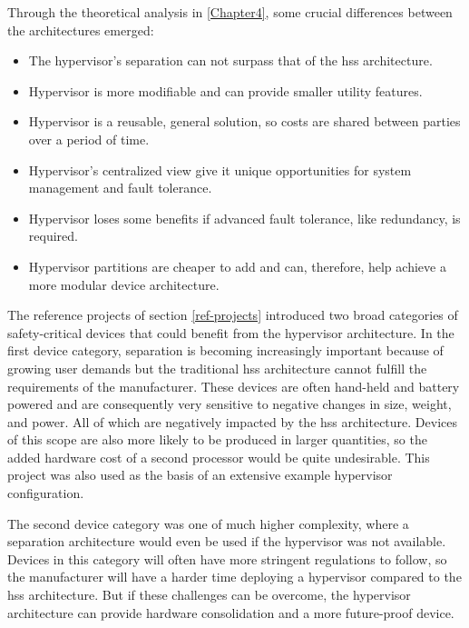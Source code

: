 Through the theoretical analysis in \ref{Chapter4}, some crucial differences between the architectures emerged:
\begin{itemize}
    \item The hypervisor's separation can not surpass that of the \acrshort{hss} architecture.
    \item Hypervisor is more modifiable and can provide smaller utility features.
    \item Hypervisor is a reusable, general solution, so costs are shared between parties over a period of time.
    \item Hypervisor's centralized view give it unique opportunities for system management and fault tolerance.
    \item Hypervisor loses some benefits if advanced fault tolerance, like redundancy, is required.
    \item Hypervisor partitions are cheaper to add and can, therefore, help achieve a more modular device architecture.
\end{itemize}

The reference projects of section \ref{ref-projects} introduced two broad categories of safety-critical devices that could benefit from the hypervisor architecture. In the first device category, separation is becoming increasingly important because of growing user demands but the traditional \acrshort{hss} architecture cannot fulfill the requirements of the manufacturer. These devices are often hand-held and battery powered and are consequently very sensitive to negative changes in size, weight, and power. All of which are negatively impacted by the \acrshort{hss} architecture.
Devices of this scope are also more likely to be produced in larger quantities, so the added hardware cost of a second processor would be quite undesirable. This project was also used as the basis of an extensive example hypervisor configuration.

The second device category was one of much higher complexity, where a separation architecture would even be used if the hypervisor was not available. Devices in this category will often have more stringent regulations to follow, so the manufacturer will have a harder time deploying a hypervisor compared to the \acrshort{hss} architecture. But if these challenges can be overcome, the hypervisor architecture can provide hardware consolidation and a more future-proof device.

